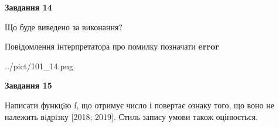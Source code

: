 \documentclass[11pt, ukrainian]{article}
\begin{document}
{\begin {large}
{\begin {center}\textbf{Завдання 14}\end {center}}\par
Що буде виведено за виконання? \par
Повідомлення інтерпретатора про помилку позначати \textbf{error}

\begin{center}
	{../pict/101_14.png}
\end{center}
\newpage

{\begin {center}\textbf{Завдання 15}\end {center}}\par

Написати функцiю f, що отримує число і повертає ознаку того, що воно не належить вiдрiзку [2018; 2019]. Стиль запису умови також оцінюється.\par
\newpage

\end {large}}
\end{document}
